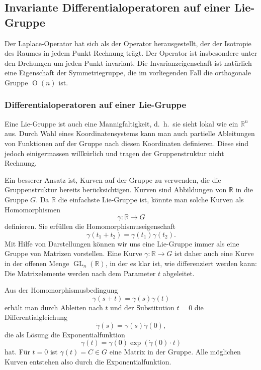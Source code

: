 %
%
\subsection{Invariante Differentialoperatoren auf einer Lie-Gruppe}
Der Laplace-Operator hat sich als der Operator herausgestellt, der
der Isotropie des Raumes in jedem Punkt Rechnung trägt.
Der Operator ist insbesondere unter den Drehungen um jeden Punkt
invariant.
Die Invarianzeigenschaft ist natürlich eine Eigenschaft der 
Symmetriegruppe, die im vorliegenden Fall die
orthogonale Gruppe $\operatorname{O}(n)$ ist.

%
%
\subsubsection{Differentialoperatoren auf einer Lie-Gruppe}
Eine Lie-Gruppe ist auch eine Mannigfaltigkeit, d.~h.~sie sieht lokal
wie ein $\mathbb{R}^n$ aus.
Durch Wahl eines Koordinatensystems kann man auch partielle
Ableitungen von Funktionen auf der Gruppe nach diesen Koordinaten
definieren.
Diese sind jedoch einigermassen willkürlich und tragen der
Gruppenstruktur nicht Rechnung.

Ein besserer Ansatz ist, Kurven auf der Gruppe zu verwenden, die
die Gruppenstruktur bereits berücksichtigen.
Kurven sind Abbildungen von $\mathbb{R}$ in die Gruppe $G$.
Da $\mathbb{R}$ die einfachste Lie-Gruppe ist, könnte man solche
Kurven als Homomorphismen
\[
\gamma
\colon
\mathbb{R} \to  G
\]
definieren.
Sie erfüllen die Homomorphismuseigenschaft
\[
\gamma(t_1+t_2) = \gamma(t_1)\gamma(t_2).
\]
Mit Hilfe von Darstellungen können wir uns eine Lie-Gruppe immer als
eine Gruppe von Matrizen vorstellen.
Eine Kurve $\gamma\colon \mathbb{R}\to G$ ist daher auch eine Kurve in
der offenen Menge $\operatorname{GL}_n(\mathbb{R})$, in der es klar ist,
wie differenziert werden kann:
Die Matrixelemente werden nach dem Parameter $t$ abgeleitet.

Aus der Homomorphismusbedingung
\begin{equation}
\gamma(s+t)=\gamma(s)\gamma(t)
\label{buch:operatoren:casimir:eqn:homomorph}
\end{equation}
erhält man durch Ableiten nach $t$ und der Substitution $t=0$ die 
Differentialgleichung
\[
\dot{\gamma}(s) = \gamma(s) \dot{\gamma}(0),
\]
die als Lösung die Exponentialfunktion
\[
\gamma(t) = \gamma(0) \exp(\dot{\gamma}(0)\cdot t)
\]
hat.
Für $t=0$ ist $\gamma(t)=C\in G$ eine Matrix in der Gruppe.
Alle möglichen Kurven entstehen also durch die Exponentialfunktion.

